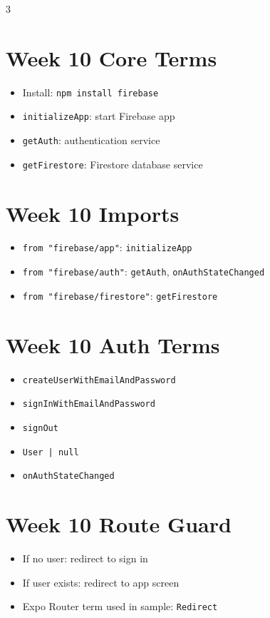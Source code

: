 \documentclass[10pt,letterpaper]{article}
\begin{document}
\begin{multicols}{3}
\section*{Week 10 Core Terms}
\begin{itemize}
  \item Install: \texttt{npm install firebase}
  \item \texttt{initializeApp}: start Firebase app
  \item \texttt{getAuth}: authentication service
  \item \texttt{getFirestore}: Firestore database service
\end{itemize}

\section*{Week 10 Imports}
\begin{itemize}
  \item \texttt{from "firebase/app"}: \texttt{initializeApp}
  \item \texttt{from "firebase/auth"}: \texttt{getAuth}, \texttt{onAuthStateChanged}
  \item \texttt{from "firebase/firestore"}: \texttt{getFirestore}
\end{itemize}

\section*{Week 10 Auth Terms}
\begin{itemize}
  \item \texttt{createUserWithEmailAndPassword}
  \item \texttt{signInWithEmailAndPassword}
  \item \texttt{signOut}
  \item \texttt{User | null}
  \item \texttt{onAuthStateChanged}
\end{itemize}

\section*{Week 10 Route Guard}
\begin{itemize}
  \item If no user: redirect to sign in
  \item If user exists: redirect to app screen
  \item Expo Router term used in sample: \texttt{Redirect}
\end{itemize}


\end{multicols}
\end{document}
